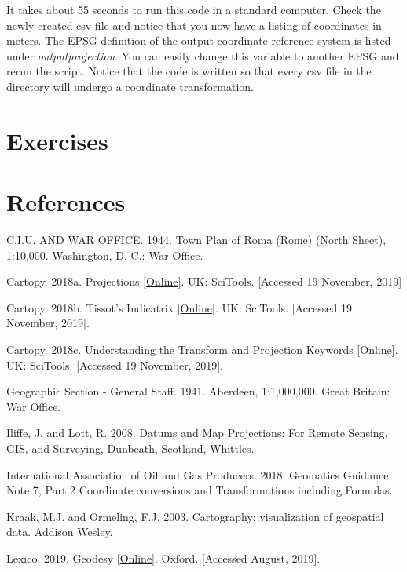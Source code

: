 \documentclass[a4paper , 12pt]{book}
\begin{document}
It takes about 55 seconds to run this code in a standard computer. Check the newly created csv file and notice that you now have a listing of coordinates in meters. The EPSG definition of the output coordinate reference system is listed under \textit{output\textunderscore projection}. You can easily change this variable to another EPSG and rerun the script. Notice that the code is written so that every csv file in the directory will undergo a coordinate transformation. 

\section{Exercises}

\section*{References}

C.I.U. AND WAR OFFICE. 1944. Town Plan of Roma (Rome) (North Sheet), 1:10,000. Washington, D. C.: War Office.

Cartopy. 2018a. Projections [\href{https://scitools.org.uk/cartopy/docs/latest/crs/projections.html}{Online}]. UK: SciTools. [Accessed 19 November, 2019]

Cartopy. 2018b. Tissot’s Indicatrix [\href{https://scitools.org.uk/cartopy/docs/latest/gallery/tissot.html}{Online}]. UK: SciTools. [Accessed 19 November, 2019].

Cartopy. 2018c. Understanding the Transform and Projection Keywords [\href{https://scitools.org.uk/cartopy/docs/latest/tutorials/understanding_transform.html}{Online}]. UK: SciTools. [Accessed 19 November, 2019].

Geographic Section - General Staff. 1941. Aberdeen, 1:1,000,000. Great Britain: War Office.

Iliffe, J. and Lott, R. 2008. Datums and Map Projections: For Remote Sensing, GIS, and Surveying, Dunbeath, Scotland, Whittles.

International Association of Oil and Gas Producers. 2018. Geomatics Guidance Note 7, Part 2 Coordinate conversions and Transformations including Formulas.

Kraak, M.J. and Ormeling, F.J. 2003. Cartography: visualization of geospatial data. Addison Wesley.

Lexico. 2019. Geodesy [\href{https://www.lexico.com/en/definition/geodesy}{Online}]. Oxford. [Accessed August, 2019].
\end{document}

